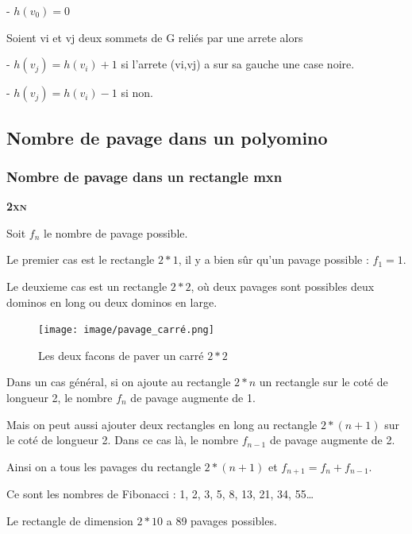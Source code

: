 \documentclass{article}
\begin{document}
- $h\left ( v_{0} \right )= 0$

Soient vi et vj deux sommets de G reliés par une arrete alors

- $h\left ( v_{j} \right )= h\left ( v_{i} \right ) + 1$ si l'arrete (vi,vj) a sur sa gauche une case noire.

- $h\left ( v_{j} \right )= h\left ( v_{i} \right ) - 1$ si non.




\newpage

\subsection{Nombre de pavage dans un polyomino}

\hspace{1cm}

\subsubsection{Nombre de pavage dans un rectangle mxn}

\hspace{1.5cm}

\textbf{\textsc{2xn}}

Soit $f_{n}$ le nombre de pavage possible.

Le premier cas est le rectangle $2*1$, il y a bien sûr qu’un pavage possible : $f_{1} = 1$.

Le deuxieme cas est un rectangle $2*2$, où deux pavages sont possibles deux dominos en long ou deux dominos en large.

\begin{figure} [!h]
    \center
    \texttt{[image: image/pavage\_carré.png]}
    \caption{Les deux facons de paver un carré  $2*2$}
\end{figure}

Dans un cas général, si on ajoute au rectangle $2*n$ un rectangle sur le coté de longueur 2, le nombre $f_{n}$ de pavage augmente de 1.

Mais on peut aussi ajouter deux rectangles en long au rectangle $2*(n+1)$ sur le coté de longueur 2. Dans ce cas là, le nombre $f_{n-1}$ de pavage augmente de 2.

Ainsi on a tous les pavages du rectangle $2*(n+1)$ et $f_{n+1} = f_{n} + f_{n-1}$.

Ce sont les nombres de Fibonacci : 1, 2, 3, 5, 8, 13, 21, 34, 55…

Le rectangle de dimension $2*10$ a 89 pavages possibles.
\end{document}
